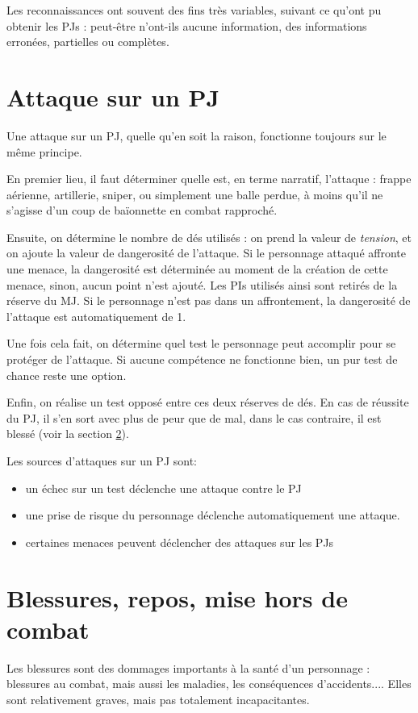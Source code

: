 \documentclass{report}
\begin{document}
\begin{multicols}{2}

Les reconnaissances ont souvent des fins très variables, suivant ce qu'ont pu obtenir les PJs : peut-être n'ont-ils aucune information, des informations erronées, partielles ou complètes. 
\section{Attaque sur un PJ}
\label{attaque}
Une attaque sur un PJ, quelle qu'en soit la raison, fonctionne toujours sur le même principe.

En premier lieu, il faut déterminer quelle est, en terme narratif, l'attaque : frappe aérienne, artillerie, sniper, ou simplement une balle perdue, à moins qu'il ne s'agisse d'un coup de baïonnette en combat rapproché.

Ensuite, on détermine le nombre de dés utilisés : on prend la valeur de \emph{tension}, et on ajoute la valeur de dangerosité de l'attaque. Si le personnage attaqué affronte une menace, la dangerosité est déterminée au moment de la création de cette menace, sinon, aucun point n'est ajouté. Les PIs utilisés ainsi sont retirés de la réserve du MJ. Si le personnage n'est pas dans un affrontement, la dangerosité de l'attaque est automatiquement de 1.

Une fois cela fait, on détermine quel test le personnage peut accomplir pour se protéger de l'attaque. Si aucune compétence ne fonctionne bien, un pur test de chance reste une option. 

Enfin, on réalise un test opposé entre ces deux réserves de dés. En cas de réussite du PJ, il s'en sort avec plus de peur que de mal, dans le cas contraire, il est blessé (voir la section \ref{blessure}).

Les sources d'attaques sur un PJ sont:
\begin{itemize}
    \item un échec sur un test déclenche une attaque contre le PJ
    \item une prise de risque du personnage déclenche automatiquement une attaque.
    \item certaines menaces peuvent déclencher des attaques sur les PJs
\end{itemize}

\section{Blessures, repos, mise hors de combat}
\label{blessure}
Les blessures sont des dommages importants à la santé d'un personnage : blessures au combat, mais aussi les maladies, les conséquences d'accidents.... Elles sont relativement graves, mais pas totalement incapacitantes.


\end{multicols}
\end{document}

